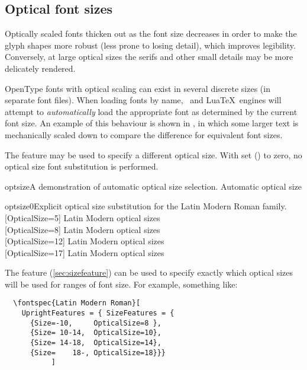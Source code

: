 \documentclass[a4paper]{l3doc}
\begin{document}
\subsection{Optical font sizes} \label{sec:opticalsize}

Optically scaled fonts thicken out as the font size decreases
in order to make the glyph shapes more robust (less prone to losing
detail), which improves legibility. Conversely, at large optical
sizes the serifs and other small details may be more delicately
rendered.

OpenType fonts with optical scaling can exist in
several discrete sizes (in separate font files).
When loading fonts by name, \XeTeX\ and Lua\TeX\ engines will attempt to
\emph{automatically} load the appropriate font as determined by the current font size.
An example of this behaviour is shown in , in which some larger text is
mechanically scaled down to compare the difference for equivalent font sizes.

The  feature may be used to specify a different optical size.
With  set ()
to zero, no optical size font substitution is performed.

\begin{Lexample}{optsize}{A demonstration of automatic optical size selection.}
   Automatic optical size                  \\
  \scalebox{0.4}{\Huge
   Automatic optical size}
\end{Lexample}

\begin{Lexample}{optsize0}{Explicit optical size substitution for the Latin Modern Roman family.}
  [OpticalSize=5]
   Latin Modern optical sizes                \\
  [OpticalSize=8]
   Latin Modern optical sizes                \\
  [OpticalSize=12]
   Latin Modern optical sizes                \\
  [OpticalSize=17]
   Latin Modern optical sizes
\end{Lexample}

The  feature (\vref{sec:sizefeature}) can be
used to specify exactly which optical sizes will be used for ranges
of font size. For example, something like:
\begin{Verbatim}
  \fontspec{Latin Modern Roman}[
    UprightFeatures = { SizeFeatures = {
      {Size=-10,     OpticalSize=8 },
      {Size= 10-14,  OpticalSize=10},
      {Size= 14-18,  OpticalSize=14},
      {Size=    18-, OpticalSize=18}}}
           ]
\end{Verbatim}
\end{document}
